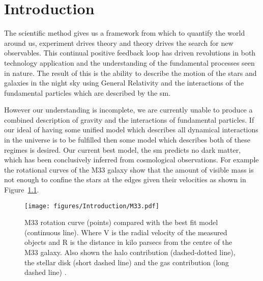 \chapter{Introduction} %
\label{cha:introduction}

The scientific method gives us a framework from which to quantify the world 
around us, experiment drives theory and theory drives the search for new 
observables. This continual positive feedback loop has driven revolutions in 
both technology application and the understanding of the fundamental processes 
seen in nature. The result of this is the ability to describe the motion of the 
stars and galaxies in the night sky using General Relativity and the 
interactions of the fundamental particles which are described by the \ac{sm}.


However our understanding is incomplete, we are currently unable to produce a 
combined description of gravity and the interactions of fundamental particles. 
If our ideal of having some unified model which describes all dynamical 
interactions in the universe is to be fulfilled then some model which describes 
both of these regimes is desired.
Our current best model, the \ac{sm} predicts no dark matter, which has been 
conclusively inferred from cosmological observations. For example the 
rotational curves of the M33 galaxy show that the amount 
of visible mass is not enough to confine the stars at the edges given their 
velocities as shown in Figure~\ref{fig:M33RotationalCurve}.
\begin{figure}
 \texttt{[image: figures/Introduction/M33.pdf]}
\caption{ M33 rotation curve (points) compared with the best fit model
          (continuous line). Where V is the radial velocity of the measured
          objects and R is the distance in kilo parsecs from the centre of
          the M33 galaxy. Also shown  the halo contribution (dashed-dotted 
          line), the stellar disk (short dashed line) and  the gas contribution 
          (long dashed line) .
          }
\label{fig:M33RotationalCurve}
\end{figure}

